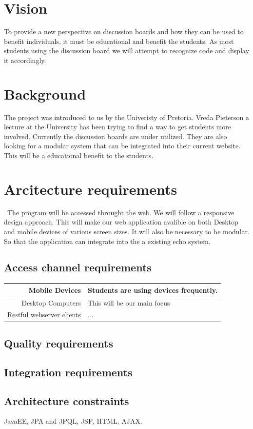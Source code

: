 \documentclass[a4paper,12pt]{report}
\begin{document}
\section{Vision}
To provide a new perspective on discussion boards and how they can be used to benefit individuals, it must be educational and benefit the students. As most students using the discussion board we will attempt to recognize code and display it accordingly.
\section{Background}
The project was introduced to us by the Univeristy of Pretoria. Vreda Pieterson a lecture at the University has been trying to find a way to get students more involved. Currently the discussion boards are under utilized. They are also looking for a modular system that can be integrated into their current website. This will be a educational benefit to the students.
\section{Arcitecture requirements}\
The program will be accessed throught the web. We will follow a responsive design approach. This will make our web application avalible on both Desktop and mobile devices of various screen sizes. It will also be necessary to be modular. So that the application can integrate into the a existing echo system.
\subsection{Access channel requirements}

\begin{tabular}{|r|l|}
\hline
Mobile Devices & Students are using devices frequently. \\
\hline
Desktop Computers &  This will be our main focus\\
\hline
Restful webserver clients & ... \\
\hline
\end{tabular}

\subsection{Quality requirements}
\subsection{Integration requirements}
\subsection{Architecture constraints}
JavaEE, JPA and JPQL, JSF, HTML,
AJAX.
\end{document}
